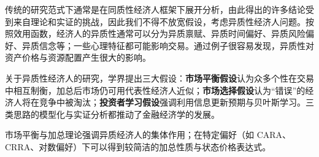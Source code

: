 

\begin{tcolorbox}[summary,title=本章小结]
传统的研究范式下通常是在同质性经济人框架下展开分析，由此得出的许多结论受到来自理论和实证的挑战，因此我们不得不放宽假设，考虑异质性经济人问题。按照效用函数，经济人的异质性通常可以分为异质禀赋、异质时间偏好、异质风险偏好、异质信念等；一些心理特征都可能影响交易。通过例子很容易发现，异质性对资产价格与资源配置产生很大的影响。

关于异质性经济人的研究，学界提出三大假设：\textbf{市场平衡假设}认为众多个性在交易中相互制衡，加总后市场仍可用代表性经济人近似；\textbf{市场选择假设}认为“错误”的经济人将在竞争中被淘汰；\textbf{投资者学习假设}强调利用信息更新预期与贝叶斯学习。三类思路的模型化与实证分析都推动了金融经济学的发展。

市场平衡与加总理论强调异质经济人的集体作用；在特定偏好（如 CARA、CRRA、对数偏好）下可以得到较简洁的加总性质与状态价格表达式。
\end{tcolorbox}



